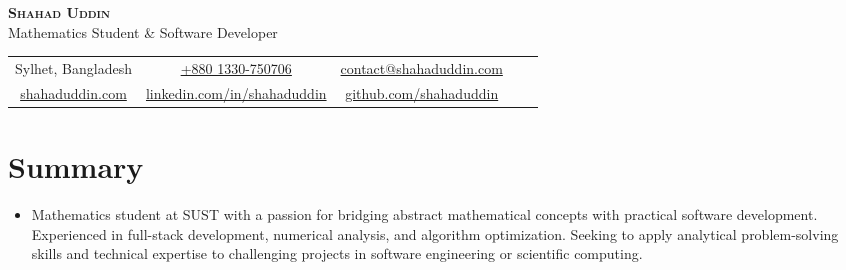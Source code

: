 \documentclass[a4paper, 10pt]{article}
\begin{document}
\begin{center}
    {\Huge\scshape\bfseries Shahad Uddin} \\[3pt]
    {\large\color{secondary} Mathematics Student \& Software Developer} \\[8pt]
    \small
    \begin{tabular}{c c c c c}
        \faMapMarker*{} Sylhet, Bangladesh & 
        \faPhone{} \href{tel:+880 1330-750706}{+880 1330-750706} &
        \faEnvelope{} \href{mailto:contact@shahaduddin.com}{contact@shahaduddin.com} \\[-1pt]
        \faGlobe{} \href{https://shahaduddin.com}{shahaduddin.com} &
        \faLinkedin{} \href{https://linkedin.com/in/shahaduddin}{linkedin.com/in/shahaduddin} &
        \faGithub{} \href{https://github.com/shahaduddin}{github.com/shahaduddin}
    \end{tabular}
\end{center}
\vspace{6pt}

\section{Summary}
\begin{itemize}[leftmargin=0.15in, label={}]
    \item Mathematics student at SUST with a passion for bridging abstract mathematical concepts with practical software development. Experienced in full-stack development, numerical analysis, and algorithm optimization. Seeking to apply analytical problem-solving skills and technical expertise to challenging projects in software engineering or scientific computing.
\end{itemize}

\end{document}
